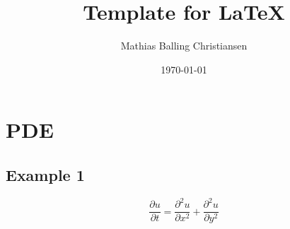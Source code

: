 \documentclass{article}
\title{Template for \LaTeX}
\author{Mathias Balling Christiansen}
\date{\today}
\begin{document}
\maketitle
\tableofcontents
\newpage
\section{PDE}

\subsection{Example 1}
$$\frac{\partial u}{\partial t} = \frac{\partial^2 u}{\partial x^2} + \frac{\partial^2 u}{\partial y^2}$$
\end{document}

